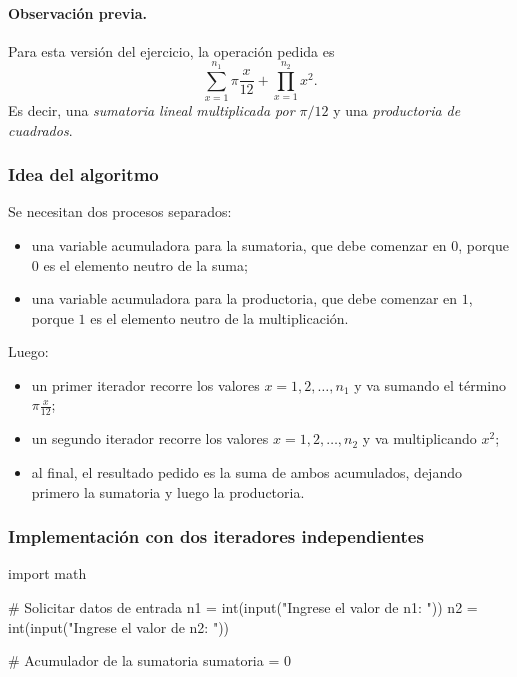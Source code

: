 \begin{solution}

\paragraph{Observación previa.}
Para esta versión del ejercicio, la operación pedida es
\[
\sum_{x=1}^{n_1} \pi \frac{x}{12}+\prod_{x=1}^{n_2} x^{2}.
\]
Es decir, una \emph{sumatoria lineal multiplicada por $\pi/12$} y una \emph{productoria de cuadrados}.

\subsubsection*{Idea del algoritmo}

Se necesitan dos procesos separados:

\begin{itemize}
    \item una variable acumuladora para la sumatoria, que debe comenzar en \(0\), porque \(0\) es el elemento neutro de la suma;
    \item una variable acumuladora para la productoria, que debe comenzar en \(1\), porque \(1\) es el elemento neutro de la multiplicación.
\end{itemize}

Luego:

\begin{itemize}
    \item un primer iterador recorre los valores \(x=1,2,\dots,n_1\) y va sumando el término \(\pi\frac{x}{12}\);
    \item un segundo iterador recorre los valores \(x=1,2,\dots,n_2\) y va multiplicando \(x^2\);
    \item al final, el resultado pedido es la suma de ambos acumulados, dejando primero la sumatoria y luego la productoria.
\end{itemize}

\subsubsection*{Implementación con dos iteradores independientes}

\begin{pythonjupyter}
import math

# Solicitar datos de entrada
n1 = int(input("Ingrese el valor de n1: "))
n2 = int(input("Ingrese el valor de n2: "))

# Acumulador de la sumatoria
sumatoria = 0


\end{pythonjupyter}
\end{solution}
